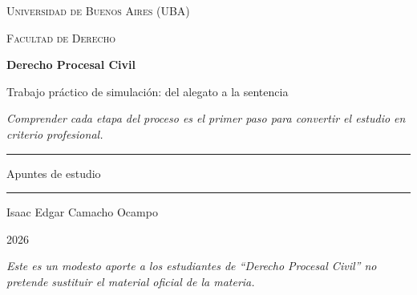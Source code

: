 \documentclass[12pt,oneside]{book}
\newcommand{\universidad}{Universidad de Buenos Aires (UBA)}
\newcommand{\facultad}{Facultad de Derecho}
\newcommand{\materia}{Derecho Procesal Civil}
\newcommand{\titulo}{Trabajo pr\'actico de simulaci\'on: del alegato a la sentencia}
\newcommand{\autor}{Isaac Edgar Camacho Ocampo}
\newcommand{\anio}{2026}
\begin{document}
\begin{titlepage}

\thispagestyle{empty}

\begin{center}

\vspace*{1cm}

{\large \textsc{\universidad}}

\vspace{0.2cm}

{\large \textsc{\facultad}}

\vspace{3cm}

{\Huge \textbf{\materia}}

\vspace{1cm}

{\LARGE \titulo}

\vspace{0.8cm}

\textit{Comprender cada etapa del proceso es el primer paso para convertir el estudio en criterio profesional.}

\vspace{1.2cm}

\rule{0.70\textwidth}{0.5pt}

\vspace{0.5cm}

{\large Apuntes de estudio}

\vspace{0.5cm}

\rule{0.70\textwidth}{0.5pt}

\vfill

{\large \autor}

\vspace{0.3cm}

{\large \anio}

\end{center}

\vfill

\begin{flushleft}
\textit{Este es un modesto aporte a los estudiantes de ``Derecho Procesal Civil'' no pretende sustituir el material oficial de la materia.}
\end{flushleft}

\end{titlepage}

\tableofcontents
\clearpage
\end{document}
